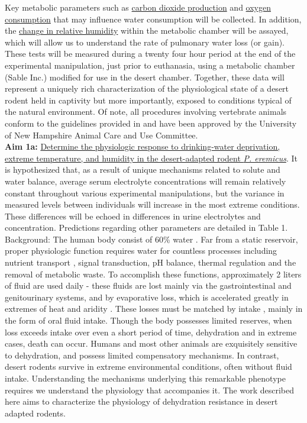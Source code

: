\documentclass[11pt]{article}
\begin{document}
Key metabolic parameters such as \ul{carbon dioxide production} and \ul{oxygen consumption} that may influence water consumption will be collected. In addition, the \ul{change in relative humidity} within the metabolic chamber will be assayed, which will allow us to understand the rate of pulmonary water loss (or gain). These tests will be measured during a twenty four hour period at the end of the experimental manipulation, just prior to euthanasia, using a metabolic chamber (Sable Inc.) modified for use in the desert chamber. Together, these data will represent a uniquely rich characterization of the physiological state of a desert rodent held in captivity but more importantly, exposed to conditions typical of the natural environment. Of note, all procedures involving vertebrate animals conform to the guidelines provided in \citep{Sikes:2011dz} and have been approved by the University of New Hampshire Animal Care and Use Committee. \\

\noindent \textbf{Aim 1a:} \ul{Determine the physiologic response to drinking-water deprivation, extreme temperature, and humidity in the desert-adapted rodent \textit{P. eremicus}}. It is hypothesized that, as a result of unique mechanisms related to solute and water balance, average serum electrolyte concentrations will remain relatively constant throughout various experimental manipulations, but the variance in measured levels between individuals will increase in the most extreme conditions. These differences will be echoed in differences in urine electrolytes and concentration. Predictions regarding other parameters are detailed in Table 1. \\


Background: The human body consist of 60\% water \citep{Jequier:2009cz}. Far from a static reservoir, proper physiologic function requires water for countless processes including nutrient transport \citep{Haussinger:1996wl}, signal transduction, pH balance, thermal regulation \citep{Montain:1999ux} and the removal of metabolic waste. To accomplish these functions, approximately 2 liters of fluid are used daily - these fluids are lost mainly via the gastrointestinal and genitourinary systems, and by evaporative loss, which is accelerated greatly in extremes of heat and aridity \citep{Cheuvront:2010eg}. These losses must be matched by intake \citep{Jequier:2009cz}, mainly in the form of oral fluid intake. Though the body possesses limited reserves, when loss exceeds intake over even a short period of time, dehydration and in extreme cases, death can occur. Humans and most other animals are exquisitely sensitive to dehydration, and possess limited compensatory mechanisms. In contrast, desert rodents survive in extreme environmental conditions, often without fluid intake. Understanding the mechanisms underlying this remarkable phenotype requires we understand the physiology that accompanies it. The work described here aims to characterize the physiology of dehydration resistance in desert adapted rodents. \\
\end{document}

